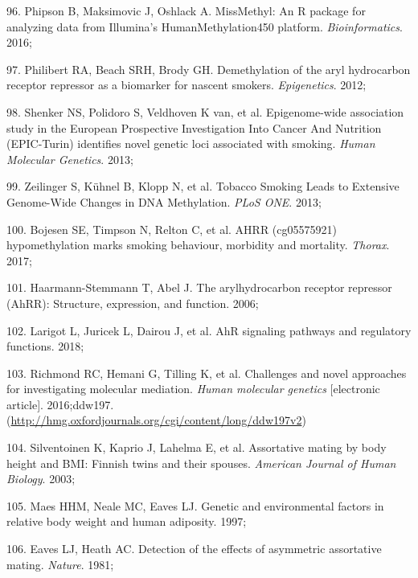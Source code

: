 \documentclass[11pt,oneside]{bristolthesis}
\newenvironment{cslreferences}%
  {}%
  {\par}
\begin{document}
\begin{cslreferences}
\leavevmode\hypertarget{ref-Phipson2016}{}%
96. Phipson B, Maksimovic J, Oshlack A. MissMethyl: An R package for analyzing data from Illumina's HumanMethylation450 platform. \emph{Bioinformatics}. 2016;

\leavevmode\hypertarget{ref-Philibert2012}{}%
97. Philibert RA, Beach SRH, Brody GH. Demethylation of the aryl hydrocarbon receptor repressor as a biomarker for nascent smokers. \emph{Epigenetics}. 2012;

\leavevmode\hypertarget{ref-Shenker2013}{}%
98. Shenker NS, Polidoro S, Veldhoven K van, et al. Epigenome-wide association study in the European Prospective Investigation Into Cancer And Nutrition (EPIC-Turin) identifies novel genetic loci associated with smoking. \emph{Human Molecular Genetics}. 2013;

\leavevmode\hypertarget{ref-Zeilinger2013}{}%
99. Zeilinger S, Kühnel B, Klopp N, et al. Tobacco Smoking Leads to Extensive Genome-Wide Changes in DNA Methylation. \emph{PLoS ONE}. 2013;

\leavevmode\hypertarget{ref-Bojesen2017}{}%
100. Bojesen SE, Timpson N, Relton C, et al. AHRR (cg05575921) hypomethylation marks smoking behaviour, morbidity and mortality. \emph{Thorax}. 2017;

\leavevmode\hypertarget{ref-Haarmann-Stemmann2006}{}%
101. Haarmann-Stemmann T, Abel J. The arylhydrocarbon receptor repressor (AhRR): Structure, expression, and function. 2006;

\leavevmode\hypertarget{ref-Larigot2018}{}%
102. Larigot L, Juricek L, Dairou J, et al. AhR signaling pathways and regulatory functions. 2018;

\leavevmode\hypertarget{ref-Richmond2016}{}%
103. Richmond RC, Hemani G, Tilling K, et al. Challenges and novel approaches for investigating molecular mediation. \emph{Human molecular genetics} {[}electronic article{]}. 2016;ddw197. (\url{http://hmg.oxfordjournals.org/cgi/content/long/ddw197v2})

\leavevmode\hypertarget{ref-Silventoinen2003}{}%
104. Silventoinen K, Kaprio J, Lahelma E, et al. Assortative mating by body height and BMI: Finnish twins and their spouses. \emph{American Journal of Human Biology}. 2003;

\leavevmode\hypertarget{ref-Maes1997}{}%
105. Maes HHM, Neale MC, Eaves LJ. Genetic and environmental factors in relative body weight and human adiposity. 1997;

\leavevmode\hypertarget{ref-Eaves1981}{}%
106. Eaves LJ, Heath AC. Detection of the effects of asymmetric assortative mating. \emph{Nature}. 1981;


\end{cslreferences}
\end{document}
